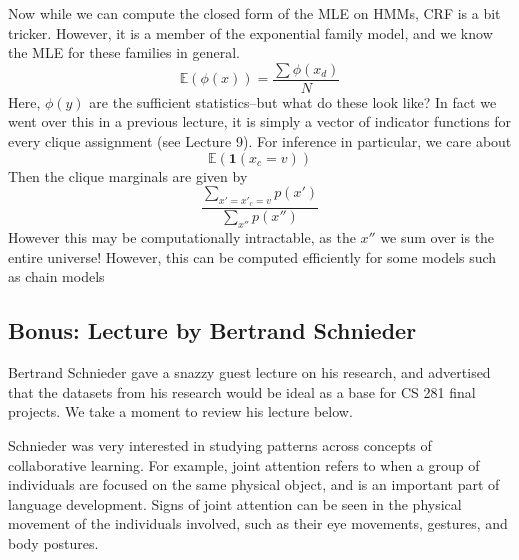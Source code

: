 \documentclass{article}
\begin{document}
Now while we can compute the closed form of the MLE on HMMs, CRF is a bit tricker. However, it is a member of the exponential family model, and we know the MLE for these families in general.
\[
\mathbb{E}(\phi(x)) = \frac{\sum \phi(x_d)}{N}
\]
Here, $\phi(y)$ are the sufficient statistics--but what do these look like? In fact we went over this in a previous lecture, it is simply a vector of indicator functions for every clique assignment (see Lecture 9). For inference in particular, we care about
\[
\mathbb{E}(\textbf{1}(x_c=v))
\]
Then the clique marginals are given by
\[
\frac{\sum\limits_{x'=x'_c=v} p(x')}{\sum\limits_{x''}p(x'')}
\]
However this may be computationally intractable, as the $x''$ we sum over is the entire universe! However, this can be computed efficiently for some models such as chain models

\subsection{Bonus: Lecture by Bertrand Schnieder}

Bertrand Schnieder gave a snazzy guest lecture on his research, and advertised that the datasets from his research would be ideal as a base for CS 281 final projects.  We take a moment to review his lecture below.

Schnieder was very interested in studying patterns across concepts of collaborative learning. For example, joint attention refers to when a group of individuals are focused on the same physical object, and is an important part of language development. Signs of joint attention can be seen in the physical movement of the individuals involved, such as their eye movements, gestures, and body postures. 
\end{document}
